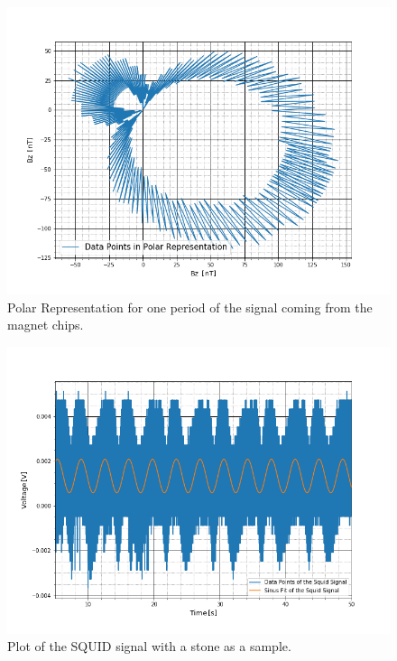 \begin{figure}[ht]
	\includegraphics[scale=0.5]{Bild/Magnetspan}
	\centering
	\caption[Polar Representation for Magnet Chips]{Polar Representation for one period of the signal coming from the magnet chips.}
\end{figure}
\begin{figure}[ht]
	\includegraphics[scale=0.5]{Bild/P4_1}
	\centering
	\caption[SQUID signal of a Stone 1]{Plot of the SQUID signal with a stone as a sample.}
\end{figure}
